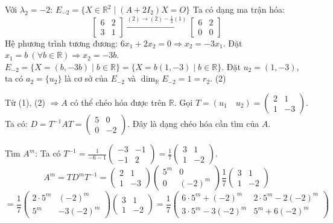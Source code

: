 \documentclass[12pt,a4paper]{article}
\newcommand{\R}{\mathbb{R}}
\begin{document}
Với $\lambda_2 = -2$:
$E_{-2} = \{ X \in \R^2 \mid (A + 2I_2)X = O \}$
Ta có dạng ma trận hóa:
\[
\begin{bmatrix} 6 & 2 \\ 3 & 1 \end{bmatrix} \xrightarrow{(2) \to (2) - \frac{1}{2}(1)} \begin{bmatrix} 6 & 2 \\ 0 & 0 \end{bmatrix}
\]
Hệ phương trình tương đương: $6x_1 + 2x_2 = 0 \Rightarrow x_2 = -3x_1$.
Đặt $x_1 = b \ (\forall b \in \R) \Rightarrow x_2 = -3b$.
$E_{-2} = \{ X = (b, -3b) \mid b \in \R \} = \{ X = b(1, -3) \mid b \in \R \}$.
Đặt $u_2 = (1, -3)$, ta có $a_2 = \{u_2\}$ là cơ sở của $E_{-2}$ và $\dim_{\R} E_{-2} = 1 = r_2$. \hfill (2)

Từ (1), (2) $\Rightarrow A$ có thể chéo hóa được trên $\R$.
Gọi $T = (u_1 \quad u_2) = \begin{pmatrix} 2 & 1 \\ 1 & -3 \end{pmatrix}$.
Ta có: $D = T^{-1}AT = \begin{pmatrix} 5 & 0 \\ 0 & -2 \end{pmatrix}$. Đây là dạng chéo hóa cần tìm của $A$.

Tìm $A^m$:
Ta có $T^{-1} = \frac{1}{-6 - 1}\begin{pmatrix} -3 & -1 \\ -1 & 2 \end{pmatrix} = \frac{1}{7}\begin{pmatrix} 3 & 1 \\ 1 & -2 \end{pmatrix}$.
\[
A^m = T D^m T^{-1} = \begin{pmatrix} 2 & 1 \\ 1 & -3 \end{pmatrix} \begin{pmatrix} 5^m & 0 \\ 0 & (-2)^m \end{pmatrix} \frac{1}{7}\begin{pmatrix} 3 & 1 \\ 1 & -2 \end{pmatrix}
\]
\[
= \frac{1}{7} \begin{pmatrix} 2\cdot 5^m & (-2)^m \\ 5^m & -3(-2)^m \end{pmatrix} \begin{pmatrix} 3 & 1 \\ 1 & -2 \end{pmatrix} 
= \frac{1}{7} \begin{pmatrix} 6\cdot 5^m + (-2)^m & 2\cdot 5^m - 2(-2)^m \\ 3\cdot 5^m - 3(-2)^m & 5^m + 6(-2)^m \end{pmatrix}
\]
\end{document}

